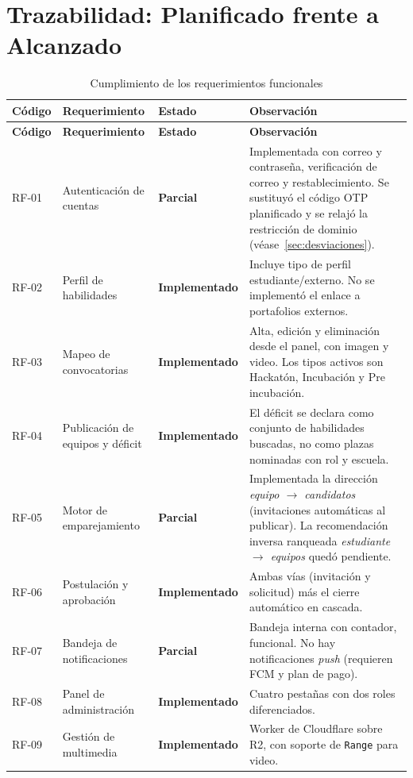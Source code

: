 \documentclass[12pt,a4paper]{article}
\newcommand{\impl}{\textbf{\color{green!45!black}Implementado}}
\newcommand{\parcial}{\textbf{\color{orange!85!black}Parcial}}
\begin{document}
\newpage
\section{Trazabilidad: Planificado frente a Alcanzado}
\label{sec:trazabilidad}

\begin{longtable}{L{1.5cm}L{4.1cm}L{2.9cm}L{5.0cm}}
\caption{Cumplimiento de los requerimientos funcionales}\label{tab:traza-rf}\\
\toprule
\textbf{Código} & \textbf{Requerimiento} & \textbf{Estado} & \textbf{Observación} \\
\midrule
\endfirsthead
\toprule
\textbf{Código} & \textbf{Requerimiento} & \textbf{Estado} & \textbf{Observación} \\
\midrule
\endhead
\bottomrule
\endfoot
RF-01 & Autenticación de cuentas & \parcial & Implementada con correo y contraseña, verificación de correo y restablecimiento. Se sustituyó el código OTP planificado y se relajó la restricción de dominio (véase~\ref{sec:desviaciones}). \\
RF-02 & Perfil de habilidades & \impl & Incluye tipo de perfil estudiante/externo. No se implementó el enlace a portafolios externos. \\
RF-03 & Mapeo de convocatorias & \impl & Alta, edición y eliminación desde el panel, con imagen y video. Los tipos activos son Hackatón, Incubación y Pre incubación. \\
RF-04 & Publicación de equipos y déficit & \impl & El déficit se declara como conjunto de habilidades buscadas, no como plazas nominadas con rol y escuela. \\
RF-05 & Motor de emparejamiento & \parcial & Implementada la dirección \emph{equipo $\rightarrow$ candidatos} (invitaciones automáticas al publicar). La recomendación inversa ranqueada \emph{estudiante $\rightarrow$ equipos} quedó pendiente. \\
RF-06 & Postulación y aprobación & \impl & Ambas vías (invitación y solicitud) más el cierre automático en cascada. \\
RF-07 & Bandeja de notificaciones & \parcial & Bandeja interna con contador, funcional. No hay notificaciones \emph{push} (requieren FCM y plan de pago). \\
RF-08 & Panel de administración & \impl & Cuatro pestañas con dos roles diferenciados. \\
RF-09 & Gestión de multimedia & \impl & Worker de Cloudflare sobre R2, con soporte de \texttt{Range} para video. \\
\end{longtable}
\end{document}
